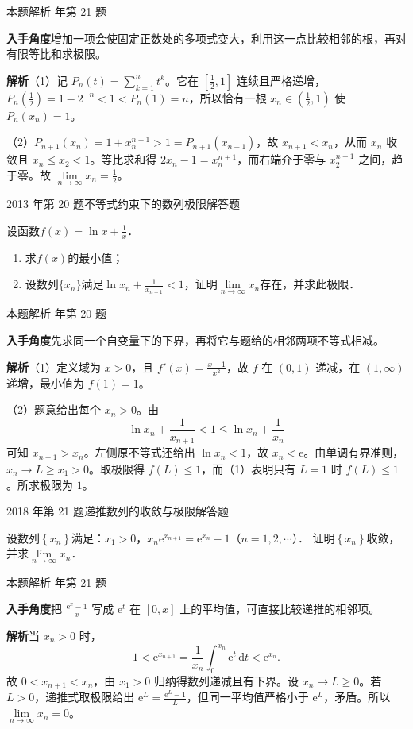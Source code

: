 \documentclass[UTF8,zihao=-4,fontset=fandol]{ctexart}
\renewcommand{\lim}{\operatorname*{lim}\limits}
\newcommand{\QuestionPage}[6]{%
  \par\noindent\begin{minipage}{\linewidth}
  \raggedright
  {\small\textcolor{black!60}{#3\quad #5}\hfill\textcolor{accent}{#2}}\par\smallskip}
\newcommand{\QuestionEnd}{\end{minipage}\par\medskip}
\newcommand{\QuestionPage}[6]{%
  \clearpage
  {\small\textcolor{accent}{#1\hfill #2}}\par\medskip
  {\small\textcolor{black!60}{#3\quad #5\hfill #6}}\par\vspace{9bp}}
\newcommand{\QuestionEnd}{}
\newenvironment{QuestionSolution}[1]{%
  \clearpage
  {\small\textcolor{black!60}{本题解析\quad #1}}\par\medskip
}{\par\clearpage}
\begin{document}
\begin{QuestionSolution}{2012 年第 21 题}
\textbf{入手角度}\quad 增加一项会使固定正数处的多项式变大，利用这一点比较相邻的根，再对有限等比和求极限。

\textbf{解析}\quad （1）记 \(P_n(t)=\sum_{k=1}^n t^k\)。它在 \([\frac{1}{2},1]\) 连续且严格递增，\(P_n(\frac{1}{2})=1-2^{-n}<1<P_n(1)=n\)，所以恰有一根 \(x_n\in(\frac{1}{2},1)\) 使 \(P_n(x_n)=1\)。

（2）\(P_{n+1}(x_n)=1+x_n^{n+1}>1=P_{n+1}(x_{n+1})\)，故 \(x_{n+1}<x_n\)，从而 \(x_n\) 收敛且 \(x_n\le x_2<1\)。等比求和得 \(2x_n-1=x_n^{n+1}\)，而右端介于零与 \(x_2^{n+1}\) 之间，趋于零。故 \(\lim_{n\to\infty}x_n=\boxed{\frac{1}{2}}\)。
\end{QuestionSolution}

\QuestionPage{1.2 数列的极限}{解答题}{2013 年第 20 题}{3}{不等式约束下的数列极限}{010 / 234}
设函数$f(x) = \ln x + \frac{1}{x}$．
\begin{enumerate}
\item
求$f(x)$的最小值；
\item
设数列$\{x_n\}$满足$\ln x_n + \frac{1}{x_{n + 1}} < 1$，证明$\lim_{n \to \infty} x_n$存在，并求此极限．
\end{enumerate}
\QuestionEnd

\begin{QuestionSolution}{2013 年第 20 题}
\textbf{入手角度}\quad 先求同一个自变量下的下界，再将它与题给的相邻两项不等式相减。

\textbf{解析}\quad （1）定义域为 \(x>0\)，且 \(f'(x)=\frac{x-1}{x^2}\)，故 \(f\) 在 \((0,1)\) 递减，在 \((1,\infty)\) 递增，最小值为 \(f(1)=1\)。

（2）题意给出每个 \(x_n>0\)。由
\[
\ln x_n+\frac1{x_{n+1}}<1\le\ln x_n+\frac1{x_n}
\]
可知 \(x_{n+1}>x_n\)。左侧原不等式还给出 \(\ln x_n<1\)，故 \(x_n<\mathrm{e}\)。由单调有界准则，\(x_n\to L\ge x_1>0\)。取极限得 \(f(L)\le1\)，而（1）表明只有 \(L=1\) 时 \(f(L)\le1\)。所求极限为 \(\boxed{1}\)。
\end{QuestionSolution}

\QuestionPage{1.2 数列的极限}{解答题}{2018 年第 21 题}{4}{递推数列的收敛与极限}{011 / 234}
设数列$\left\{x_n \right\}$满足：$x_1 > 0$，$x_n \mathrm{e}^{x_{n + 1}} = \mathrm{e}^{x_n} - 1$（$n = 1,2, \cdots$）．
证明$\left\{x_n \right\}$收敛，并求$\lim_{n \to \infty} x_n$．
\QuestionEnd

\begin{QuestionSolution}{2018 年第 21 题}
\textbf{入手角度}\quad 把 \(\frac{\mathrm{e}^x-1}{x}\) 写成 \(\mathrm{e}^t\) 在 \([0,x]\) 上的平均值，可直接比较递推的相邻项。

\textbf{解析}\quad 当 \(x_n>0\) 时，
\[
1<\mathrm{e}^{x_{n+1}}=\frac1{x_n}\int_0^{x_n}\mathrm{e}^t\,\mathrm{d}t<\mathrm{e}^{x_n}.
\]
故 \(0<x_{n+1}<x_n\)，由 \(x_1>0\) 归纳得数列递减且有下界。设 \(x_n\to L\ge0\)。若 \(L>0\)，递推式取极限给出 \(\mathrm{e}^L=\frac{\mathrm{e}^L-1}{L}\)，但同一平均值严格小于 \(\mathrm{e}^L\)，矛盾。所以 \(\lim_{n\to\infty}x_n=\boxed{0}\)。
\end{QuestionSolution}
\end{document}
